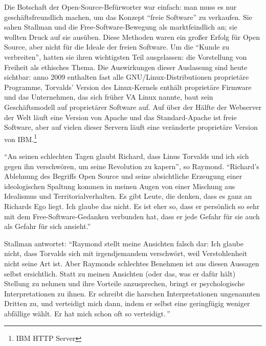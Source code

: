 Die Botschaft der Open-Source-Befürworter war einfach: man muss es nur geschäftsfreundlich machen, um das Konzept "`freie Software"' zu verkaufen. Sie sahen Stallman und die Free-Software-Bewegung als marktfeindlich an; sie wollten Druck auf sie ausüben.
Diese Methoden waren ein großer Erfolg für Open Source, aber nicht für die Ideale der freien Software. Um die "`Kunde zu verbreiten"', hatten sie ihren wichtigsten Teil ausgelassen: die Vorstellung von Freiheit als ethisches Thema. Die Auswirkungen dieser Auslassung sind heute sichtbar: anno 2009 enthalten fast alle GNU/Linux-Distributionen proprietäre Programme, Torvalds' Version des Linux-Kernels enthält proprietäre Firmware und das Unternehmen, das sich früher VA Linux nannte, baut sein Geschäftsmodell auf proprietärer Software auf. Auf über der Hälfte der Webserver der Welt läuft eine Version von Apache und das Standard-Apache ist freie Software, aber auf vielen dieser Servern läuft eine veränderte proprietäre Version von IBM.\footnote{IBM HTTP Server}

"`An seinen schlechten Tagen glaubt Richard, dass Linus Torvalds und ich sich gegen ihn verschwören, um seine Revolution zu kapern"', so Raymond. "`Richard's Ablehnung des Begriffs \glq Open Source\grq{} und seine absichtliche Erzeugung einer ideologischen Spaltung %
kommen in meinen Augen von einer Mischung aus Idealismus und Territorialverhalten. Es gibt Leute, die denken, dass es ganz an Richards Ego liegt. Ich glaube das nicht. Es ist eher so, dass er persönlich so sehr mit dem Free-Software-Gedanken verbunden hat, dass er jede Gefahr für sie auch als Gefahr für sich ansieht."'

Stallman antwortet: "`Raymond stellt meine Ansichten falsch dar: Ich glaube nicht, dass Torvalds sich mit irgendjemandem \glq verschwört\grq, weil Verstohlenheit nicht seine Art ist. Aber Raymonds schlechtes Benehmen ist aus diesen Aussagen selbst ersichtlich. Statt zu meinen Ansichten (oder das, was er dafür hält) Stellung zu nehmen und ihre Vorteile anzusprechen, bringt er psychologische Interpretationen zu ihnen. Er schreibt die harschen Interpretationen ungenannten Dritten zu, und \glq verteidigt\grq{} mich dann, indem er selbst eine geringfügig weniger abfällige wählt. Er hat mich schon oft so \glq verteidigt\grq.\,"'

